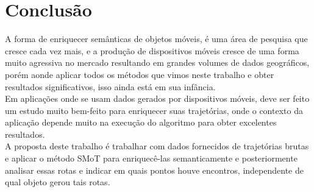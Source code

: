 \documentclass[	12pt, Times, openright, twoside, a4paper, english, brazil]{abntex2}
\begin{document}
  \chapter{Conclusão}
    A forma de enriquecer semânticas de objetos móveis, é uma área de pesquisa que cresce cada vez mais, e a produção de dispositivos móveis cresce de uma forma muito agressiva no mercado resultando em grandes volumes de dados geográficos, porém aonde aplicar todos os métodos que vimos neste trabalho e obter resultados significativos, isso ainda está em sua infância. \\
    \indent	Em aplicações onde se usam dados gerados por dispositivos móveis, deve ser feito um estudo muito bem-feito para enriquecer suas trajetórias, onde o contexto da aplicação depende muito na execução do algoritmo para obter excelentes resultados.\\
    \indent	A proposta deste trabalho é trabalhar com dados fornecidos de trajetórias brutas e aplicar o método SMoT para enriquecê-las semanticamente e posteriormente analisar essas rotas e indicar em quais pontos houve encontros, independente de qual objeto gerou tais rotas.






\end{document}
